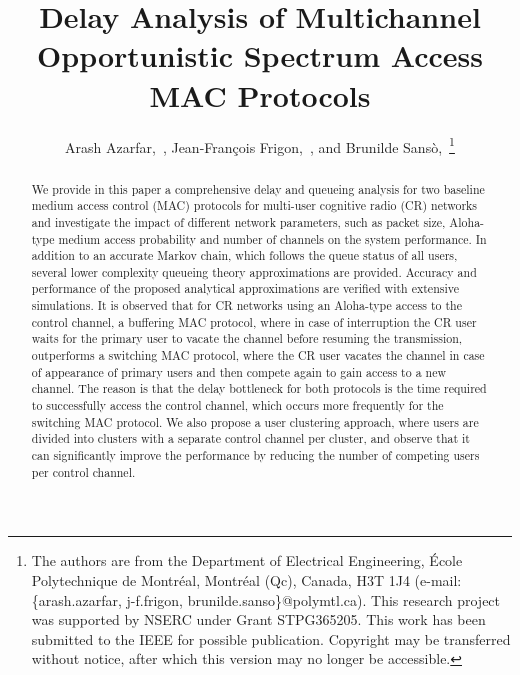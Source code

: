 \documentclass[12pt,journal,oneside,onecolumn]{IEEEtran}
\begin{document}
\title{Delay Analysis of Multichannel Opportunistic Spectrum Access MAC Protocols}
\author{Arash Azarfar,~, Jean-Fran\c{c}ois Frigon,~, and Brunilde Sans\`o,~\thanks{The authors are from the Department of Electrical Engineering, \'{E}cole Polytechnique de Montr\'{e}al, Montr\'{e}al (Qc), Canada, H3T 1J4 (e-mail: \{arash.azarfar, j-f.frigon, brunilde.sanso\}@polymtl.ca). \newline \indent This research project was supported by NSERC under Grant STPG365205. \newline This work has been submitted to the IEEE for possible publication. Copyright may be transferred without notice, after which
this version may no longer be accessible.}
}


\maketitle
\begin{abstract}
We provide in this paper a comprehensive delay and queueing analysis for two baseline 
medium access control (MAC) protocols for  
multi-user cognitive radio (CR) networks and investigate the impact 
of different network parameters, such as packet size, Aloha-type medium access 
probability and number of channels on the system performance. 
In addition to an accurate Markov chain, which follows the queue status of all users, 
several lower complexity queueing theory approximations are provided. Accuracy and performance 
of the proposed analytical approximations are verified with extensive simulations. It is observed 
that for CR networks using an Aloha-type access to the control channel, a buffering MAC protocol, 
where in case of interruption the CR user waits for the primary user to vacate the channel before resuming the
transmission, outperforms 
a switching MAC protocol, where the CR user vacates the channel in case of appearance of 
primary users and then compete again to gain access to a new channel. The reason is that the delay
bottleneck for both protocols is the time required to successfully access the control channel,
which occurs more frequently for the switching MAC protocol. We also propose a user clustering approach, 
where users are divided into clusters with a separate control channel per 
cluster, and observe that it can significantly improve the performance by reducing the number 
of competing users per control channel. 
\end{abstract}
\end{document}
